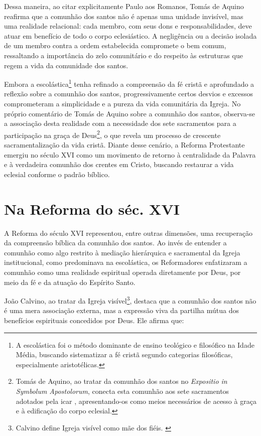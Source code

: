 Dessa maneira, ao citar explicitamente Paulo aos Romanos, Tomás de Aquino reafirma que a comunhão dos santos não é apenas uma unidade invisível, mas uma realidade relacional: cada membro, com seus dons e responsabilidades, deve atuar em benefício de todo o corpo eclesiástico. A negligência ou a decisão isolada de um membro contra a ordem estabelecida compromete o bem comum, ressaltando a importância do zelo comunitário e do respeito às estruturas que regem a vida da comunidade dos santos.

Embora a escolástica\footnote{A escolástica foi o método dominante de ensino teológico e filosófico na Idade Média, buscando sistematizar a fé cristã segundo categorias filosóficas, especialmente aristotélicas.} tenha refinado a compreensão da fé cristã e aprofundado a reflexão sobre a comunhão dos santos, progressivamente certos desvios e excessos comprometeram a simplicidade e a pureza da vida comunitária da Igreja. No próprio comentário de Tomás de Aquino sobre a comunhão dos santos, observa-se a associação desta realidade com a necessidade dos sete sacramentos para a participação na graça de Deus\footnote{Tomás de Aquino, ao tratar da comunhão dos santos no \textit{\foreignlanguage{latin}{Expositio in Symbolum Apostolorum}}, conecta esta comunhão aos sete sacramentos adotados pela \gls{icar} \cite{aquinoCredo2004}, apresentando-os como meios necessários de acesso à graça e à edificação do corpo eclesial.}, o que revela um processo de crescente sacramentalização da vida cristã. Diante desse cenário, a Reforma Protestante emergiu no século XVI como um movimento de retorno à centralidade da Palavra e à verdadeira comunhão dos crentes em Cristo, buscando restaurar a vida eclesial conforme o padrão bíblico.

\section{Na Reforma do séc. XVI}

A Reforma do século XVI representou, entre outras dimensões, uma recuperação da compreensão bíblica da comunhão dos santos. Ao invés de entender a comunhão como algo restrito à mediação hierárquica e sacramental da Igreja institucional, como predominava na escolástica, os Reformadores enfatizaram a comunhão como uma realidade espiritual operada diretamente por Deus, por meio da fé e da atuação do Espírito Santo.

João Calvino, ao tratar da Igreja visível\footnote{Calvino define Igreja visível como mãe dos fiéis. \cite[v.~4, p.~1865]{calvino2022}}, destaca que a comunhão dos santos não é uma mera associação externa, mas a expressão viva da partilha mútua dos benefícios espirituais concedidos por Deus. Ele afirma que:

